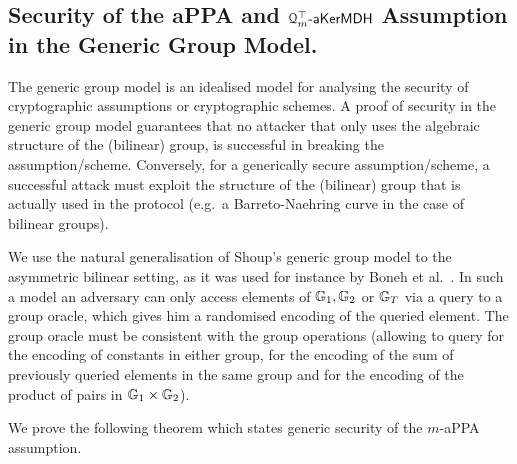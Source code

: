 \subsection{Security of the aPPA and $\mathcal{Q}_m^\top\mbox{-}\mathsf{aKerMDH}$ Assumption in the Generic Group Model.}
The generic group model is an idealised model for analysing the security of cryptographic assumptions or cryptographic schemes. A proof of security in the generic group model guarantees that no attacker that only uses the algebraic structure of the (bilinear) group, is successful in breaking the assumption/scheme. Conversely, for a generically secure assumption/scheme, a successful attack must exploit the structure of the (bilinear) group that is actually used in the protocol (e.g.~a Barreto-Naehring curve in the case of bilinear groups).  

We use the natural generalisation of Shoup's generic group model \cite{EC:Shoup97} to the asymmetric bilinear setting, as it was used for instance by Boneh et al.~\cite{EC:BonBoyGoh05}. In such a model an adversary can only access elements of $\mathbb{G}_1,\mathbb{G}_2$ or $\mathbb{G}_T$ via a query to a group oracle, which gives him a randomised  encoding of the queried element. The group oracle must be consistent with the group operations (allowing to query for the encoding of constants in either group, for the encoding of the sum of previously queried elements in the same group and for the encoding of the product of pairs in $\mathbb{G}_1\times \mathbb{G}_2$).

We prove the following theorem which states generic security of the $m$-aPPA assumption.


